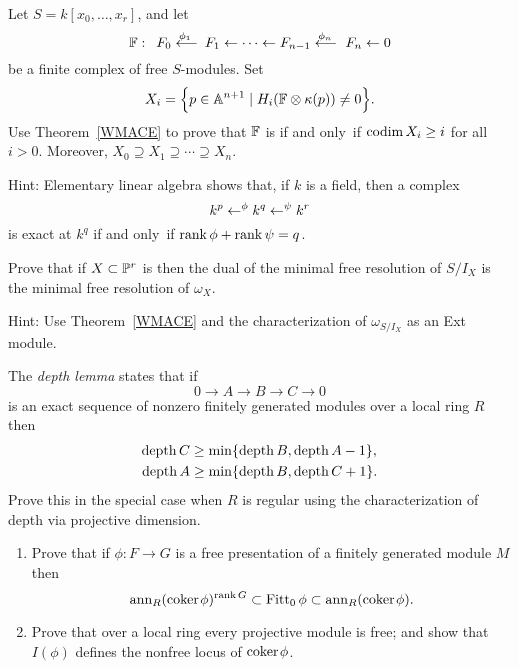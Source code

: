 \begin{exercise}\label{WMACE corollary}
Let $S = k[x_0,\dots, x_r]$, and let
$$
\FF:\quad  
F_0\luto{\phi_1}F_1 \leftarrow \cdots \leftarrow F_{n-1}\luto{\phi_n} F_n\leftarrow 0
$$
be a finite complex of free $S$-modules. Set
$$
X_i =\Big\{p\in \mathbb A^{n+1} \mid  H_i({\mathbb F} \otimes \kappa(p)) \neq 0 \Big\}.
$$
Use Theorem~\ref{WMACE} to prove that ${\mathbb F}$ is 
%
if and only~if
$
\operatorname{codim} X_i \geq i
$
for all $i>0$. Moreover, $X_{0}\supseteq X_{1}\supseteq \cdots \supseteq
X_{n}$.

Hint: Elementary linear algebra shows that, if $k$ is a field, then a
complex $$k^p \leftarrow^{\phi} k^q \leftarrow^\psi k^r$$ is exact at $k^q$ if and
only~if $\operatorname{rank} \phi +\operatorname{rank} \psi = q$.
\end{exercise}

\begin{exercise}
Prove that if $X\subset \mathbb P^r$ is 
%
then
the dual of the minimal free resolution of $S/I_X$
is the minimal free resolution of $\omega_X$.

Hint: Use Theorem~\ref{WMACE}
and the characterization of $\omega_{S/I_X}$
as an Ext module.
\end{exercise}

\begin{exercise}
The \emph{depth lemma} states that if
%
$$
0\to A\to B\to C \to 0
$$
is an exact sequence of nonzero finitely generated modules over a local
ring $R$ then
$$
\begin{aligned}
\operatorname{depth} C &\geq \min\{\operatorname{depth} B, \operatorname{depth} A-1\},\\
\operatorname{depth} A & \geq \min\{\operatorname{depth} B, \operatorname{depth} C +1\}.
\end{aligned}
$$
Prove this in the special case when $R$ is regular using the
characterization of depth
via projective dimension.
\end{exercise}

\begin{exercise}
\begin{enumerate}
\item Prove that if $\phi: F\to G$ is a free presentation of a finitely
generated module $M$
then
$$
{\rm{ann}}_{R}({\rm{coker}\kern1pt} \phi)^{\operatorname{rank} G}\subset \operatorname{Fitt}_{0}\phi \subset
{\rm{ann}}_{R}({\rm{coker}\kern1pt} \phi).
$$
\item Prove that over a local ring every projective module is free;
and show that
$I(\phi)$ defines the nonfree locus of ${\rm{coker}\kern1pt} \phi$.
\end{enumerate}
\end{exercise}

